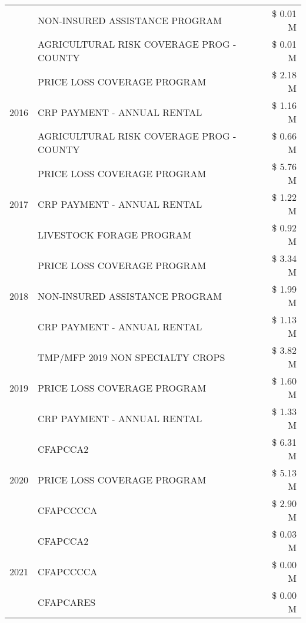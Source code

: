 \begin{tabular}{llr}
 & NON-INSURED ASSISTANCE PROGRAM & \$ 0.01 M \\
 & AGRICULTURAL RISK COVERAGE PROG - COUNTY & \$ 0.01 M \\
\cline{1-3}
\multirow[t]{3}{*}{2016} & PRICE LOSS COVERAGE PROGRAM & \$ 2.18 M \\
 & CRP PAYMENT - ANNUAL RENTAL & \$ 1.16 M \\
 & AGRICULTURAL RISK COVERAGE PROG - COUNTY & \$ 0.66 M \\
\cline{1-3}
\multirow[t]{3}{*}{2017} & PRICE LOSS COVERAGE PROGRAM & \$ 5.76 M \\
 & CRP PAYMENT - ANNUAL RENTAL & \$ 1.22 M \\
 & LIVESTOCK FORAGE PROGRAM & \$ 0.92 M \\
\cline{1-3}
\multirow[t]{3}{*}{2018} & PRICE LOSS COVERAGE PROGRAM & \$ 3.34 M \\
 & NON-INSURED ASSISTANCE PROGRAM & \$ 1.99 M \\
 & CRP PAYMENT - ANNUAL RENTAL & \$ 1.13 M \\
\cline{1-3}
\multirow[t]{3}{*}{2019} & TMP/MFP 2019 NON SPECIALTY CROPS & \$ 3.82 M \\
 & PRICE LOSS COVERAGE PROGRAM & \$ 1.60 M \\
 & CRP PAYMENT - ANNUAL RENTAL & \$ 1.33 M \\
\cline{1-3}
\multirow[t]{3}{*}{2020} & CFAPCCA2 & \$ 6.31 M \\
 & PRICE LOSS COVERAGE PROGRAM & \$ 5.13 M \\
 & CFAPCCCCA & \$ 2.90 M \\
\cline{1-3}
\multirow[t]{3}{*}{2021} & CFAPCCA2 & \$ 0.03 M \\
 & CFAPCCCCA & \$ 0.00 M \\
 & CFAPCARES & \$ 0.00 M \\
\cline{1-3}
\bottomrule
\end{tabular}
